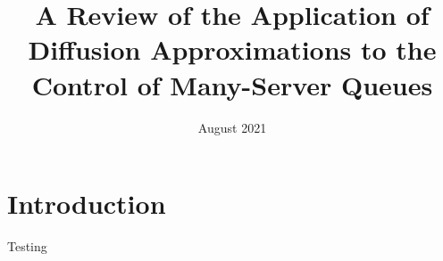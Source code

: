 \documentclass{article}
\title{A Review of the Application of Diffusion Approximations to the Control of Many-Server Queues}
\author{}
\date{August 2021}
\begin{document}
\maketitle

\section{Introduction}
Testing
\end{document}
